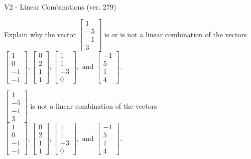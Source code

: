 \begin{exercise}
  \begin{exerciseTitle}V2 - Linear Combinations (ver. 279)\end{exerciseTitle}
  \begin{exerciseStatement}
    Explain why the vector \(\left[\begin{array}{c}
1 \\
-5 \\
-1 \\
3
\end{array}\right]\)  is or is not a linear 
	combination of the vectors \(\left[\begin{array}{c}
1 \\
0 \\
-1 \\
-1
\end{array}\right] , \left[\begin{array}{c}
0 \\
2 \\
1 \\
1
\end{array}\right] , \left[\begin{array}{c}
1 \\
1 \\
-3 \\
0
\end{array}\right] , \text{ and } \left[\begin{array}{c}
-1 \\
5 \\
1 \\
4
\end{array}\right]\).
	


  \end{exerciseStatement}
  \begin{exerciseAnswer}
   \(\left[\begin{array}{c}
1 \\
-5 \\
-1 \\
3
\end{array}\right]\) 
  	 is not  
	a linear combination of the vectors \(\left[\begin{array}{c}
1 \\
0 \\
-1 \\
-1
\end{array}\right] , \left[\begin{array}{c}
0 \\
2 \\
1 \\
1
\end{array}\right] , \left[\begin{array}{c}
1 \\
1 \\
-3 \\
0
\end{array}\right] , \text{ and } \left[\begin{array}{c}
-1 \\
5 \\
1 \\
4
\end{array}\right]\).


\end{exerciseAnswer}
\end{exercise}
